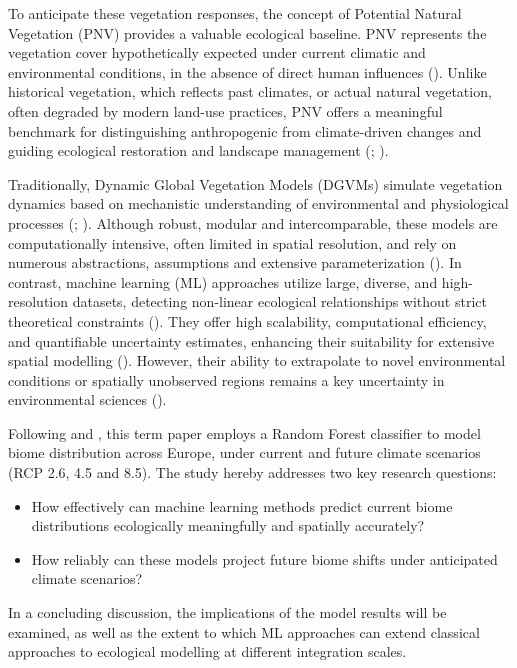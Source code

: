 \documentclass[
]{krantz}
\begin{document}
To anticipate these vegetation responses, the concept of Potential Natural Vegetation (PNV) provides a valuable ecological baseline. PNV represents the vegetation cover hypothetically expected under current climatic and environmental conditions, in the absence of direct human influences (\citet{levavasseur2012}). Unlike historical vegetation, which reflects past climates, or actual natural vegetation, often degraded by modern land-use practices, PNV offers a meaningful benchmark for distinguishing anthropogenic from climate-driven changes and guiding ecological restoration and landscape management (\citet{ni2006}; \citet{weisman2008}).

Traditionally, Dynamic Global Vegetation Models (DGVMs) simulate vegetation dynamics based on mechanistic understanding of environmental and physiological processes (\citet{hickler2012}; \citet{prentice2007}). Although robust, modular and intercomparable, these models are computationally intensive, often limited in spatial resolution, and rely on numerous abstractions, assumptions and extensive parameterization (\citet{prentice2007}). In contrast, machine learning (ML) approaches utilize large, diverse, and high-resolution datasets, detecting non-linear ecological relationships without strict theoretical constraints (\citet{pichler2023}). They offer high scalability, computational efficiency, and quantifiable uncertainty estimates, enhancing their suitability for extensive spatial modelling (\citet{lindgren2021}). However, their ability to extrapolate to novel environmental conditions or spatially unobserved regions remains a key uncertainty in environmental sciences (\citet{meyer2021}).

Following \citet{hengl2018} and \citet{bonannella2023}, this term paper employs a Random Forest classifier to model biome distribution across Europe, under current and future climate scenarios (RCP 2.6, 4.5 and 8.5). The study hereby addresses two key research questions:

\begin{itemize}
\item
  How effectively can machine learning methods predict current biome distributions ecologically meaningfully and spatially accurately?
\item
  How reliably can these models project future biome shifts under anticipated climate scenarios?
\end{itemize}

In a concluding discussion, the implications of the model results will be examined, as well as the extent to which ML approaches can extend classical approaches to ecological modelling at different integration scales.
\end{document}
